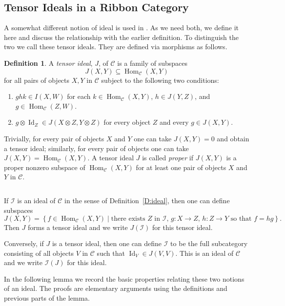 \documentclass[12pt, reqno]{amsart}
\theoremstyle{definition}
\newtheorem{definition}[theorem]{Definition}
\newcommand{\Hom}{\operatorname{Hom}}
\renewcommand{\1}{_{(1)}}
\renewcommand{\2}{_{(2)}}
\newcommand{\3}{_{(3)}}
\newcommand{\4}{_{(4)}}
\newcommand{\cat}{\mathcal{C}}
\newcommand{\ideal}{\mathcal{I}}
\newcommand{\Id}{\operatorname{Id}}
\begin{document}
\subsection{Tensor Ideals in a Ribbon Category}\label{SS:homideals}
A somewhat different notion of ideal is used in \cite{CO1, CO2}.  As we need both, we define it here and discuss the relationship with the earlier definition.  To distinguish the two we call these tensor ideals.  They are defined via morphisms as follows.

\begin{definition}\label{D:Homideal}  A \emph{tensor ideal}, $J$, of $\cat$ is a family of subspaces 
\[
J(X,Y) \subseteq \Hom_{\cat}(X,Y)
\] for all pairs of objects $X,Y$ in $\cat$ subject to the following two conditions:
\begin{enumerate}
\item $ghk \in I(X,W)$ for each $k \in \Hom_{\cat}(X,Y)$, $h \in  J(Y,Z)$, and $g \in \Hom_{\cat}(Z,W)$.
\item $g\otimes \Id_{Z} \in J(X\otimes Z, Y\otimes Z)$ for every object $Z$ and every $g \in J(X,Y)$. 
\end{enumerate}
\end{definition} Trivially, for every pair of objects $X$ and $Y$ one can take $J(X,Y) =0$ and obtain a tensor ideal; similarly, for every pair of objects one can take $J(X,Y) = \Hom_{\cat}(X,Y)$.  A tensor ideal $J$ is called \emph{proper} if $J(X,Y)$ is a proper nonzero subspace of $\Hom_{\cat}(X,Y)$ for at least one pair of objects $X$ and $Y$ in $\cat$.

\subsection{}  If $\ideal$ is an ideal of $\cat$ in the sense of Definition~\ref{D:ideal}, then one can define subspaces 
\[
J(X,Y) = \left\{f \in \Hom_{\cat}(X,Y) \mid \text{there exists $Z$ in $\ideal$,  $g: X \to Z$, $h:Z \to Y$ so that $f=hg$} \right\}.
\]  Then $J$ forms a tensor ideal and we write $J(\ideal)$ for this tensor ideal.

Conversely, if $J$ is a tensor ideal, then one can define $\ideal$ to be the full subcategory consisting of 
all objects $V$ in $\cat$ such that $\Id_{V} \in J(V,V)$.  This is an ideal of $\cat$  and we write $\ideal (J)$ for this ideal.  

In the following lemma we record the basic properties relating these two notions of an ideal.  The proofs are elementary arguments using the definitions and previous parts of the lemma.
\end{document}
